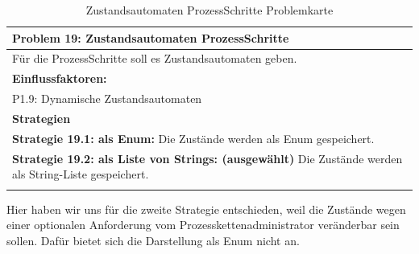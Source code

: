 \documentclass[enabledeprecatedfontcommands,fontsize=12pt,paper=a4,twoside]{scrartcl}
\begin{document}
\begin{table}[H]
    \centering
    \begin{tabular}{|p{15cm}|}
    \hline
          \textbf{Problem 19:} Zustandsautomaten ProzessSchritte
          \\ \hline
          Für die ProzessSchritte soll es Zustandsautomaten geben.
          \\ \hline
          \textbf{Einflussfaktoren: } \\
         P1.9: Dynamische Zustandsautomaten \\
          \hline
          \textbf{Strategien} \\ \hline
          	 {}          
           \label{strategie:19.1} 
	\textbf{Strategie 19.1: als Enum:} Die Zustände werden als Enum gespeichert. \\
	{}          
           \label{strategie:19.2} 
	\textbf{Strategie 19.2: als Liste von Strings: (ausgewählt)} Die Zustände werden als String-Liste gespeichert. \\
          \\ \hline
    \end{tabular}
    \caption{Zustandsautomaten ProzessSchritte Problemkarte}
    \label{tab:ProblemKarte19}
\end{table}
Hier haben wir uns für die zweite Strategie entschieden, weil die Zustände wegen einer optionalen Anforderung vom Prozesskettenadministrator veränderbar sein sollen. Dafür bietet sich die Darstellung als Enum nicht an. \\
\end{document}
